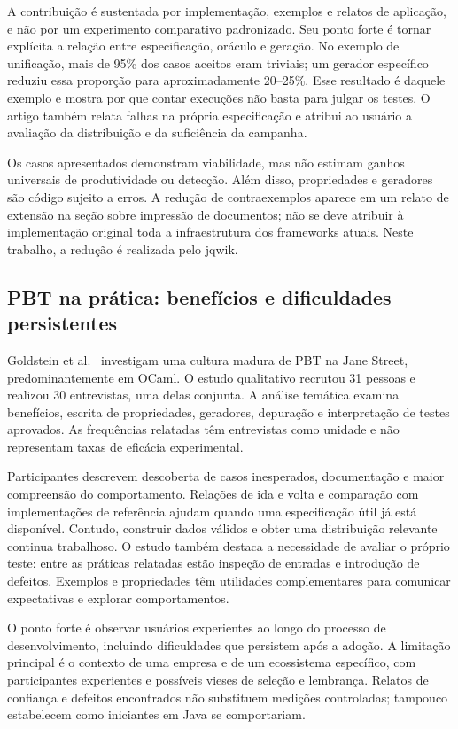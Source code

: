 \documentclass[11pt,a4paper]{article}
\begin{document}
A contribuição é sustentada por implementação, exemplos e relatos de aplicação, e não por um experimento comparativo padronizado. Seu ponto forte é tornar explícita a relação entre especificação, oráculo e geração. No exemplo de unificação, mais de 95\% dos casos aceitos eram triviais; um gerador específico reduziu essa proporção para aproximadamente 20--25\%. Esse resultado é daquele exemplo e mostra por que contar execuções não basta para julgar os testes. O artigo também relata falhas na própria especificação e atribui ao usuário a avaliação da distribuição e da suficiência da campanha.

Os casos apresentados demonstram viabilidade, mas não estimam ganhos universais de produtividade ou detecção. Além disso, propriedades e geradores são código sujeito a erros. A redução de contraexemplos aparece em um relato de extensão na seção sobre impressão de documentos; não se deve atribuir à implementação original toda a infraestrutura dos frameworks atuais. Neste trabalho, a redução é realizada pelo jqwik.

\subsection{PBT na prática: benefícios e dificuldades persistentes}
Goldstein et al.~\cite{practice} investigam uma cultura madura de PBT na Jane Street, predominantemente em OCaml. O estudo qualitativo recrutou 31 pessoas e realizou 30 entrevistas, uma delas conjunta. A análise temática examina benefícios, escrita de propriedades, geradores, depuração e interpretação de testes aprovados. As frequências relatadas têm entrevistas como unidade e não representam taxas de eficácia experimental.

Participantes descrevem descoberta de casos inesperados, documentação e maior compreensão do comportamento. Relações de ida e volta e comparação com implementações de referência ajudam quando uma especificação útil já está disponível. Contudo, construir dados válidos e obter uma distribuição relevante continua trabalhoso. O estudo também destaca a necessidade de avaliar o próprio teste: entre as práticas relatadas estão inspeção de entradas e introdução de defeitos. Exemplos e propriedades têm utilidades complementares para comunicar expectativas e explorar comportamentos.

O ponto forte é observar usuários experientes ao longo do processo de desenvolvimento, incluindo dificuldades que persistem após a adoção. A limitação principal é o contexto de uma empresa e de um ecossistema específico, com participantes experientes e possíveis vieses de seleção e lembrança. Relatos de confiança e defeitos encontrados não substituem medições controladas; tampouco estabelecem como iniciantes em Java se comportariam.
\end{document}
